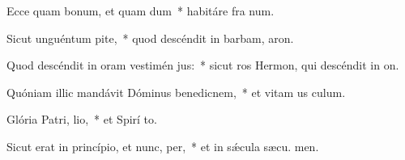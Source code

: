 \item Ecce quam bonum, et quam dum~* habitáre fra  num.
\item Sicut unguéntum  pite,~* quod descéndit in barbam,  aron.
\item Quod descéndit in oram vestimén jus:~* sicut ros Hermon, qui descéndit in  on.
\item Quóniam illic mandávit Dóminus benedicnem,~* et vitam us  culum.
\item Glória Patri,  lio,~* et Spirí to.
\item Sicut erat in princípio, et nunc,  per,~* et in sǽcula sæcu. men.

